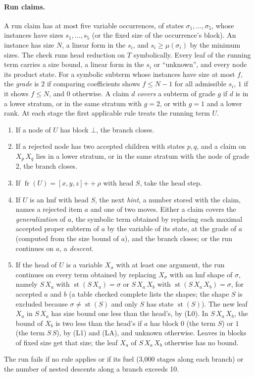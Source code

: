\documentclass[11pt]{amsart}
\theoremstyle{definition}
\theoremstyle{remark}
\newcommand{\spine}{\operatorname{fr}}
\newcommand{\app}{\mathbin{+\!\!+}}
\newcommand{\st}{\operatorname{st}}
\begin{document}
\paragraph{Run claims.} A run claim has at most five variable occurrences, of states $\sigma_1,\dots,\sigma_5$, whose
instances have sizes $s_1,\dots,s_5$ (or the fixed size of the occurrence's block). An instance
has size $N$, a linear form in the $s_i$, and $s_i\ge\mu(\sigma_i)$ by the minimum sizes. The check runs head reduction on
$T$ symbolically. Every leaf of the running term carries a size bound, a linear form in the
$s_i$ or ``unknown'', and every node its product state. For a symbolic subterm whose
instances have size at most $f$, the \emph{grade} is $2$ if comparing coefficients shows $f\le N-1$
for all admissible $s_i$, $1$ if it shows $f\le N$, and $0$ otherwise. A claim $d$ \emph{covers} a subterm of grade $g$
if $d$ is in a lower stratum, or in the same stratum with $g=2$, or with $g=1$ and a lower
rank. At each stage the first applicable rule treats the running term $U$.
\begin{enumerate}
\item[(R1)] If a node of $U$ has block $\bot$, the branch closes.
\item[(R2)] If a rejected node has two accepted children with states $p,q$, and a claim on
  $X_p\,X_q$ lies in a lower stratum, or in the same stratum with the node of grade~$2$, the
  branch closes.
\item[(R3)] If $\spine(U)=[x,y,z]\app\rho$ with head $S$, take the head step.
\item[(R4)] If $U$ is an hnf with head $S$, the next \emph{hint}, a number stored with the
  claim, names a rejected item $a$ and one of two moves. Either a claim covers the
  \emph{generalization} of $a$, the symbolic term obtained by replacing each maximal accepted
  proper subterm of $a$ by the variable of its state, at the grade of $a$ (computed from
  the size bound of $a$), and the branch closes; or the run continues on $a$, a
  \emph{descent}.
\item[(R5)] If the head of $U$ is a variable $X_\sigma$ with at least one argument, the run
  continues on every term obtained by replacing $X_\sigma$ with an hnf shape of $\sigma$, namely
  $S\,X_a$ with $\st(S\,X_a)=\sigma$ or $S\,X_a\,X_b$ with
  $\st(S\,X_a\,X_b)=\sigma$, for accepted $a$ and $b$ (a table checked complete lists the
  shapes; the shape $S$ is excluded because $\sigma\ne\st(S)$ and only $S$ has state $\st(S)$). The
  new leaf $X_a$ in $S\,X_a$ has size bound one less than the head's, by (L0). In
  $S\,X_a\,X_b$, the bound of $X_b$ is two less than the head's if $a$ has block $0$ (the
  term $S$) or $1$ (the term $S\,S$), by (L1) and (LA), and unknown otherwise. Leaves in
  blocks of fixed size get that size; the leaf $X_a$ of $S\,X_a\,X_b$ otherwise has no bound.
\end{enumerate}
The run fails if no rule applies or if its fuel (3,000 stages along each branch) or the number of nested descents along a branch exceeds 10.
\end{document}
